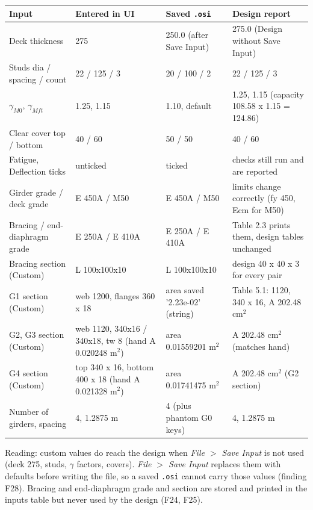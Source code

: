 \documentclass[10pt,a4paper]{article}
\begin{document}
{\small
\begin{longtable}{|p{4cm}|p{6cm}|p{5.5cm}|p{7cm}|}
\hline \textbf{Input} & \textbf{Entered in UI} & \textbf{Saved \texttt{.osi}} & \textbf{Design report} \\ \hline \endhead
Deck thickness & 275 & 250.0 (after Save Input) & 275.0 (Design without Save Input) \\ \hline
Studs dia / spacing / count & 22 / 125 / 3 & 20 / 100 / 2 & 22 / 125 / 3 \\ \hline
$\gamma_{M0}$, $\gamma_{Mft}$ & 1.25, 1.15 & 1.10, default & 1.25, 1.15 (capacity 108.58 x 1.15 = 124.86) \\ \hline
Clear cover top / bottom & 40 / 60 & 50 / 50 & 40 / 60 \\ \hline
Fatigue, Deflection ticks & unticked & ticked & checks still run and are reported \\ \hline
Girder grade / deck grade & E 450A / M50 & E 450A / M50 & limits change correctly (fy 450, Ecm for M50) \\ \hline
Bracing / end-diaphragm grade & E 250A / E 410A & E 250A / E 410A & Table 2.3 prints them, design tables unchanged \\ \hline
Bracing section (Custom) & L 100x100x10 & L 100x100x10 & design 40 x 40 x 3 for every pair \\ \hline
G1 section (Custom) & web 1200, flanges 360 x 18 & area saved '2.23e-02' (string) & Table 5.1: 1120, 340 x 16, A 202.48 cm$^2$ \\ \hline
G2, G3 section (Custom) & web 1120, 340x16 / 340x18, tw 8 (hand A 0.020248 m$^2$) & area 0.01559201 m$^2$ & A 202.48 cm$^2$ (matches hand) \\ \hline
G4 section (Custom) & top 340 x 16, bottom 400 x 18 (hand A 0.021328 m$^2$) & area 0.01741475 m$^2$ & A 202.48 cm$^2$ (G2 section) \\ \hline
Number of girders, spacing & 4, 1.2875 m & 4 (plus phantom G0 keys) & 4, 1.2875 m \\ \hline
\end{longtable}}

Reading: custom values do reach the design when \emph{File $>$ Save Input} is not used (deck 275, studs, $\gamma$ factors, covers). \emph{File $>$ Save Input} replaces them with defaults before writing the file, so a saved \texttt{.osi} cannot carry those values (finding F28). Bracing and end-diaphragm grade and section are stored and printed in the inputs table but never used by the design (F24, F25).
\end{document}
